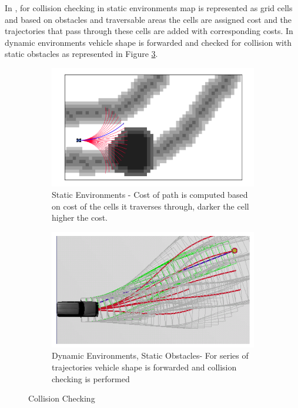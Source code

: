 In \cite{kolski_thesis}, for collision checking in static environments map is represented as grid cells and based on obstacles and traversable areas the cells are assigned cost and the trajectories that pass through these cells are added with corresponding costs. In dynamic environments vehicle shape is forwarded and checked for collision with static obstacles as represented in Figure \ref{kolskicollison}. 
\begin{figure}
	\centering
	\begin{subfigure}{.50\textwidth}
		\centering
		\includegraphics[width=1.0\linewidth]{Images/related_work/kolskistaticobst.png}
		\caption{Static Environments - Cost of path is computed based on cost of the cells it traverses through, darker the cell higher the cost.}
		\label{kolski1}
	\end{subfigure}%
	\begin{subfigure}{.50\textwidth}
		\centering
		\includegraphics[width=1.0\linewidth]{Images/related_work/dynamiccollsionkolski.png}
		\caption{Dynamic Environments, Static Obstacles- For series of trajectories vehicle shape is forwarded and collision checking is performed}
		\label{kolski2}
	\end{subfigure}
	\caption{Collision Checking \cite{kolski_thesis}}
	\label{kolskicollison}
\end{figure}

